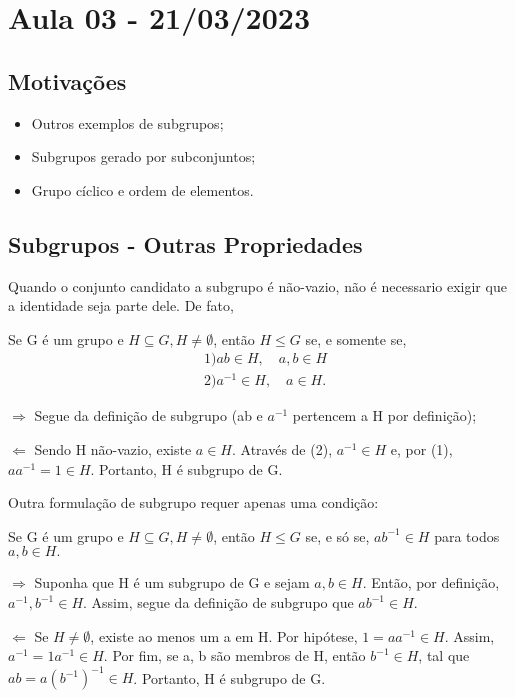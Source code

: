 \documentclass[algebra_notes.tex]{subfiles}
\begin{document}
\section{Aula 03 - 21/03/2023}
\subsection{Motivações}
\begin{itemize}
	\item Outros exemplos de subgrupos;
	\item Subgrupos gerado por subconjuntos;
	\item Grupo cíclico e ordem de elementos.
\end{itemize}
\subsection{Subgrupos - Outras Propriedades}
Quando o conjunto candidato a subgrupo é não-vazio, não é necessario exigir que a identidade seja parte dele. De fato,
\begin{prop*}
	Se G é um grupo e $H\subseteq{G}, H \neq\emptyset$, então $H\leq{G}$ se, e somente se,
	\begin{align*}
		 & 1) ab\in H, \quad a, b\in H   \\
		 & 2) a^{-1}\in H, \quad a\in H.
	\end{align*}
\end{prop*}
\begin{proof*}
	$\Rightarrow$ Segue da definição de subgrupo (ab e $a^{-1}$ pertencem a H por definição);

	$\Leftarrow$ Sendo H não-vazio, existe $a\in H$. Através de (2), $a^{-1}\in H$ e, por (1), $aa^{-1} = 1\in H.$ Portanto,
	H é subgrupo de G. \qedsymbol
\end{proof*}
Outra formulação de subgrupo requer apenas uma condição:
\begin{prop*}
	Se G é um grupo e $H\subseteq{G}, H \neq\emptyset$, então $H\leq{G}$ se, e só se, $ab^{-1}\in H$ para todos $a, b\in H.$
\end{prop*}
\begin{proof*}
	$\Rightarrow$ Suponha que H é um subgrupo de G e sejam $a, b\in H$. Então, por definição, $a^{-1}, b^{-1}\in H$. Assim,
	segue da definição de subgrupo que $ab^{-1}\in H$.

	$\Leftarrow$ Se $H \neq\emptyset$, existe ao menos um a em H. Por hipótese, $1 = aa^{-1}\in H$. Assim, $a^{-1} = 1a^{-1}\in H$.
	Por fim, se a, b são membros de H, então $b^{-1}\in H$, tal que $ab = a(b^{-1})^{-1}\in H$. Portanto, H é subgrupo de G. \qedsymbol
\end{proof*}
\end{document}
